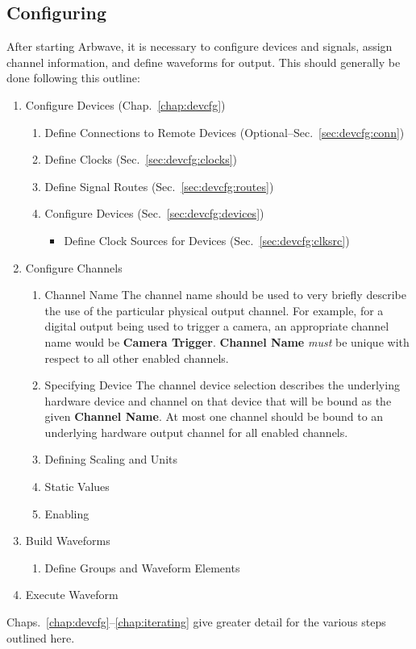 \subsection{Configuring}
After starting Arbwave, it is necessary to configure devices and signals,
assign channel information, and define waveforms for output.  This should
generally be done following this outline:
%
\begin{enumerate}
  \item Configure Devices (Chap.~\ref{chap:devcfg})

    \begin{enumerate}
      \item Define Connections to Remote Devices
           (Optional--Sec.~\ref{sec:devcfg:conn})

      \item Define Clocks (Sec.~\ref{sec:devcfg:clocks})

      \item Define Signal Routes (Sec.~\ref{sec:devcfg:routes})

      \item Configure Devices (Sec.~\ref{sec:devcfg:devices})
        \begin{itemize}
          \item Define Clock Sources for Devices (Sec.~\ref{sec:devcfg:clksrc})
        \end{itemize}

    \end{enumerate}
  \item Configure Channels
    \begin{enumerate}
      \item Channel Name
        The channel name should be used to very briefly describe the use of the
        particular physical output channel.  For example, for a digital output
        being used to trigger a camera, an appropriate channel name would be
        \textbf{Camera Trigger}.  \textbf{Channel Name} \textit{must} be unique with respect
        to all other enabled channels.
      \item Specifying Device
        The channel device selection describes the underlying hardware device
        and channel on that device that will be bound as the given
        \textbf{Channel Name}.  At most one channel should be bound to an
        underlying hardware output channel for all enabled channels.

      \item Defining Scaling and Units

      \item Static Values
      \item Enabling
    \end{enumerate}
  \item Build Waveforms
    \begin{enumerate}
      \item Define Groups and Waveform Elements
    \end{enumerate}
  \item Execute Waveform
\end{enumerate}
%
Chaps.~\ref{chap:devcfg}--\ref{chap:iterating} give greater detail for the
various steps outlined here.


